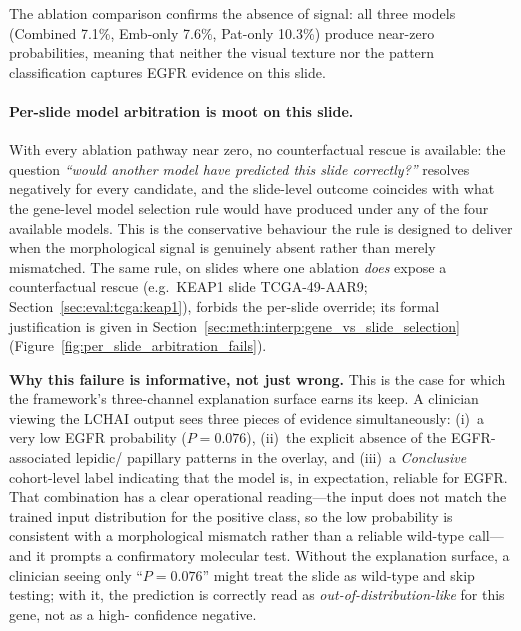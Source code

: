 The ablation comparison confirms the absence of signal: all three
models (Combined 7.1\%, Emb-only 7.6\%, Pat-only 10.3\%) produce
near-zero probabilities, meaning that neither the visual texture
nor the pattern classification captures EGFR evidence on this
slide.

\paragraph{Per-slide model arbitration is moot on this slide.}
With every ablation pathway near zero, no counterfactual
rescue is available: the question \emph{``would another model
have predicted this slide correctly?''} resolves negatively
for every candidate, and the slide-level outcome coincides
with what the gene-level model selection rule would have
produced under any of the four available models.
This is the conservative behaviour the rule is designed to
deliver when the morphological signal is genuinely absent
rather than merely mismatched.
The same rule, on slides where one ablation \emph{does}
expose a counterfactual rescue (e.g.\ KEAP1 slide
TCGA-49-AAR9; Section~\ref{sec:eval:tcga:keap1}), forbids the
per-slide override; its formal justification is given in
Section~\ref{sec:meth:interp:gene_vs_slide_selection}
(Figure~\ref{fig:per_slide_arbitration_fails}).

\textbf{Why this failure is informative, not just wrong.}
This is the case for which the framework's three-channel
explanation surface earns its keep.
A clinician viewing the LCHAI output sees three pieces of
evidence simultaneously:
(i)~a very low EGFR probability ($P = 0.076$),
(ii)~the explicit absence of the EGFR-associated lepidic/%
papillary patterns in the overlay,
and (iii)~a \emph{Conclusive} cohort-level label indicating
that the model is, in expectation, reliable for EGFR.
That combination has a clear operational reading---the input
does not match the trained input distribution for the positive
class, so the low probability is consistent with a morphological
mismatch rather than a reliable wild-type call---and it prompts
a confirmatory molecular test.
Without the explanation surface, a clinician seeing only
``$P = 0.076$'' might treat the slide as wild-type and skip
testing; with it, the prediction is correctly read as
\emph{out-of-distribution-like} for this gene, not as a high-%
confidence negative.

